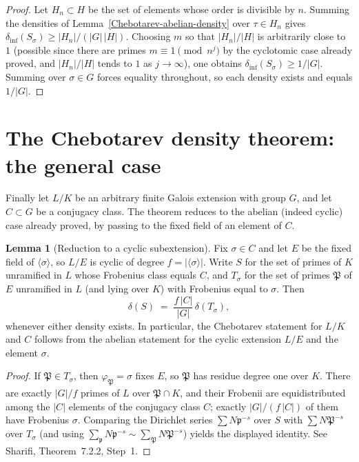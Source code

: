 \documentclass[10pt,a4paper]{article}
\newcommand{\uses}[1]{}
\theoremstyle{definition}
\newtheorem{lemma}{Lemma}[section]
\begin{document}
\begin{proof}\uses{Chebotarev-abelian-crossing, Chebotarev-abelian-density,
Chebotarev-cyclotomic-density}
Let $H_n \subset H$ be the set of elements whose order is divisible by $n$.  Summing the
densities of Lemma~\ref{Chebotarev-abelian-density} over $\tau\in H_n$ gives
$\delta_{\mathrm{inf}}(S_\sigma) \geq |H_n|/(|G|\,|H|)$.  Choosing $m$ so that $|H_n|/|H|$ is
arbitrarily close to $1$ (possible since there are primes $m\equiv 1\pmod{n^j}$ by the
cyclotomic case already proved, and $|H_n|/|H|$ tends to $1$ as $j\to\infty$), one obtains
$\delta_{\mathrm{inf}}(S_\sigma) \geq 1/|G|$.  Summing over $\sigma\in G$ forces equality
throughout, so each density exists and equals $1/|G|$.
\end{proof}
\section{The Chebotarev density theorem: the general case}

Finally let $L/K$ be an arbitrary finite Galois extension with group $G$, and let $C\subset G$
be a conjugacy class.  The theorem reduces to the abelian (indeed cyclic) case already proved,
by passing to the fixed field of an element of $C$.
\begin{lemma}[Reduction to a cyclic subextension]\label{Chebotarev-reduction}
Fix $\sigma\in C$ and let $E$ be the fixed field of $\langle\sigma\rangle$, so $L/E$ is cyclic of
degree $f = |\langle\sigma\rangle|$.  Write $S$ for the set of primes of $K$ unramified in $L$
whose Frobenius class equals $C$, and $T_\sigma$ for the set of primes $\mathfrak{P}$ of $E$
unramified in $L$ (and lying over $K$) with Frobenius equal to $\sigma$.  Then
\[
\delta(S) \;=\; \frac{f\,|C|}{|G|}\,\delta(T_\sigma),
\]
whenever either density exists.  In particular, the Chebotarev statement for $L/K$ and $C$
follows from the abelian statement for the cyclic extension $L/E$ and the element $\sigma$.
\end{lemma}
\begin{proof}
If $\mathfrak{P}\in T_\sigma$, then $\varphi_{\mathfrak{P}}=\sigma$ fixes $E$, so $\mathfrak{P}$ has
residue degree one over $K$.  There are exactly $|G|/f$ primes of $L$ over $\mathfrak{P}\cap K$,
and their Frobenii are equidistributed among the $|C|$ elements of the conjugacy class $C$;
exactly $|G|/(f\,|C|)$ of them have Frobenius $\sigma$.  Comparing the Dirichlet series
$\sum N\mathfrak{p}^{-s}$ over $S$ with $\sum N\mathfrak{P}^{-s}$ over $T_\sigma$ (and using
$\sum_{\mathfrak{p}} N\mathfrak{p}^{-s} \sim \sum_{\mathfrak{P}} N\mathfrak{P}^{-s}$) yields the
displayed identity.  See Sharifi, Theorem~7.2.2, Step~1.
\end{proof}
\end{document}
